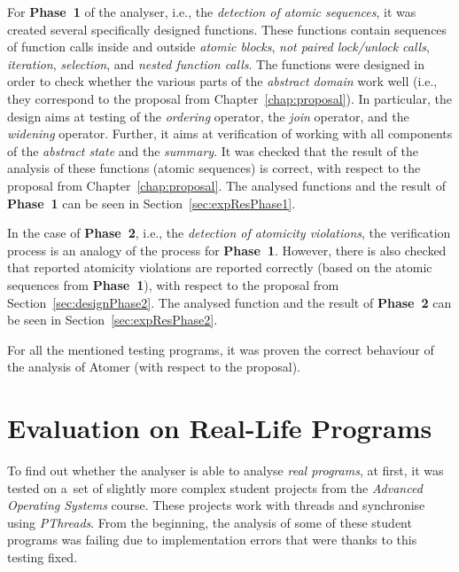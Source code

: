 For \textbf{Phase~1} of the analyser, i.e., the \emph{detection of
atomic sequences}, it was created several specifically designed functions. 
These functions contain sequences of function calls inside
and outside \emph{atomic blocks}, \emph{not paired lock/unlock calls},
\emph{iteration}, \emph{selection}, and \emph{nested function calls}.
The functions were designed in order to check whether the various parts of
the \emph{abstract domain} work well (i.e., they correspond to the proposal
from Chapter~\ref{chap:proposal}). In particular, the design aims at
testing of the \emph{ordering} operator, the \emph{join} operator,
and the \emph{widening} operator. Further, it aims at verification of
working with all components of the \emph{abstract state} and the
\emph{summary}. It was checked that the result of the analysis
of these functions (atomic sequences) is correct, with respect to
the proposal from Chapter~\ref{chap:proposal}. The analysed functions
and the result of \textbf{Phase~1} can be seen in
Section~\ref{sec:expResPhase1}.

In the case of \textbf{Phase~2}, i.e., the \emph{detection of atomicity
violations}, the verification process is an analogy of the process
for \textbf{Phase~1}. However, there is also checked that reported
atomicity violations are reported correctly (based on the atomic sequences
from \textbf{Phase~1}), with respect to the proposal from
Section~\ref{sec:designPhase2}. The analysed function and the result
of \textbf{Phase~2} can be seen in Section~\ref{sec:expResPhase2}.

For all the mentioned testing programs, it was proven the correct behaviour
of the analysis of Atomer (with respect to the proposal).


\section{Evaluation on Real-Life Programs}
\label{sec:expReal}

To find out whether the analyser is able to analyse \emph{real programs},
at first, it was tested on a~set of slightly more complex student
projects from the \emph{Advanced Operating Systems} course. These projects
work with threads and synchronise using \emph{PThreads}. From the beginning,
the analysis of some of these student programs was failing due to
implementation errors that were thanks to this testing fixed.

